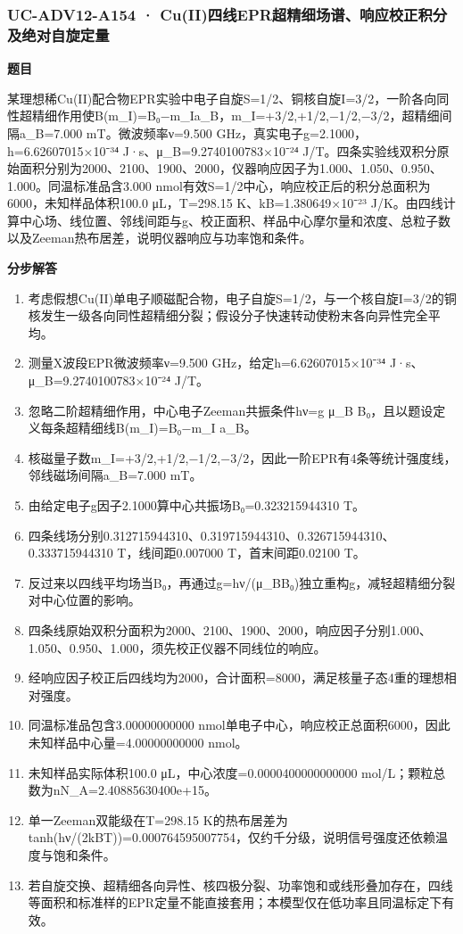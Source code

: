 \documentclass[UTF8,11pt,a4paper]{ctexart}
\begin{document}
\subsubsection*{UC-ADV12-A154 · Cu(II)四线EPR超精细场谱、响应校正积分及绝对自旋定量}
\noindent\textbf{题目}\par
某理想稀Cu(II)配合物EPR实验中电子自旋S=1/2、铜核自旋I=3/2，一阶各向同性超精细作用使B(m\_I)=B₀−m\_Ia\_B，m\_I=+3/2,+1/2,−1/2,−3/2，超精细间隔a\_B=7.000 mT。微波频率ν=9.500 GHz，真实电子g=2.1000，h=6.62607015×10⁻³⁴ J·s、μ\_B=9.2740100783×10⁻²⁴ J/T。四条实验线双积分原始面积分别为2000、2100、1900、2000，仪器响应因子为1.000、1.050、0.950、1.000。同温标准品含3.000 nmol有效S=1/2中心，响应校正后的积分总面积为6000，未知样品体积100.0 μL，T=298.15 K、kB=1.380649×10⁻²³ J/K。由四线计算中心场、线位置、邻线间距与g、校正面积、样品中心摩尔量和浓度、总粒子数以及Zeeman热布居差，说明仪器响应与功率饱和条件。\par
\medskip\noindent\textbf{分步解答}
\begin{enumerate}
\item 考虑假想Cu(II)单电子顺磁配合物，电子自旋S=1/2，与一个核自旋I=3/2的铜核发生一级各向同性超精细分裂；假设分子快速转动使粉末各向异性完全平均。
\item 测量X波段EPR微波频率ν=9.500 GHz，给定h=6.62607015×10⁻³⁴ J·s、μ\_B=9.2740100783×10⁻²⁴ J/T。
\item 忽略二阶超精细作用，中心电子Zeeman共振条件hν=g μ\_B B₀，且以题设定义每条超精细线B(m\_I)=B₀−m\_I a\_B。
\item 核磁量子数m\_I=+3/2,+1/2,−1/2,−3/2，因此一阶EPR有4条等统计强度线，邻线磁场间隔a\_B=7.000 mT。
\item 由给定电子g因子2.1000算中心共振场B₀=0.323215944310 T。
\item 四条线场分别0.312715944310、0.319715944310、0.326715944310、0.333715944310 T，线间距0.007000 T，首末间距0.02100 T。
\item 反过来以四线平均场当B₀，再通过g=hν/(μ\_BB₀)独立重构g，减轻超精细分裂对中心位置的影响。
\item 四条线原始双积分面积为2000、2100、1900、2000，响应因子分别1.000、1.050、0.950、1.000，须先校正仪器不同线位的响应。
\item 经响应因子校正后四线均为2000，合计面积=8000，满足核量子态4重的理想相对强度。
\item 同温标准品包含3.00000000000 nmol单电子中心，响应校正总面积6000，因此未知样品中心量=4.00000000000 nmol。
\item 未知样品实际体积100.0 μL，中心浓度=0.0000400000000000 mol/L；颗粒总数为nN\_A=2.40885630400e+15。
\item 单一Zeeman双能级在T=298.15 K的热布居差为tanh(hν/(2kBT))=0.000764595007754，仅约千分级，说明信号强度还依赖温度与饱和条件。
\item 若自旋交换、超精细各向异性、核四极分裂、功率饱和或线形叠加存在，四线等面积和标准样的EPR定量不能直接套用；本模型仅在低功率且同温标定下有效。
\end{enumerate}
\end{document}
